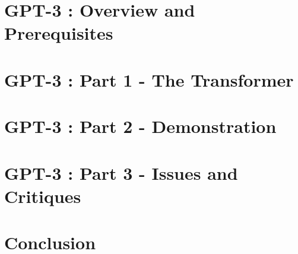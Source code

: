 \documentclass[12pt, a4paper]{report}
\begin{document}

\chapter*{GPT-3 : Overview and Prerequisites}
\label{chap:overview}
\thispagestyle{fancy}

\chapter*{GPT-3 : Part 1 - The Transformer}
\label{chap:transformer}
\thispagestyle{fancy}

\chapter*{GPT-3 : Part 2 - Demonstration}
\label{chap:demonstration}
\thispagestyle{fancy}

\chapter*{GPT-3 : Part 3 - Issues and Critiques}
\label{chap:critiques}
\thispagestyle{fancy}

\chapter*{Conclusion}
\label{chap:conclusion}
\thispagestyle{fancy}




\thispagestyle{fancy}
\end{document}
